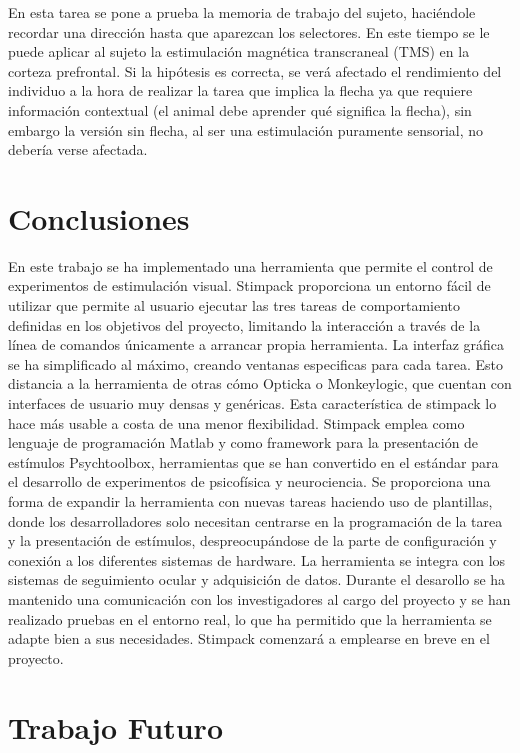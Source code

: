 \documentclass[conference]{IEEEtran}
\begin{document}
En esta tarea se pone a prueba la memoria de trabajo del sujeto, haciéndole recordar una dirección hasta que aparezcan los selectores. En este tiempo se le puede aplicar al sujeto la estimulación magnética transcraneal (TMS) en la corteza prefrontal. Si la hipótesis es correcta, se verá afectado el rendimiento del individuo a la hora de realizar la tarea que implica la flecha ya que requiere información contextual (el animal debe aprender qué significa la flecha), sin embargo la versión sin flecha, al ser una estimulación puramente sensorial, no debería verse afectada.

\section{Conclusiones}

En este trabajo se ha implementado una herramienta que permite el control de experimentos de estimulación visual.
Stimpack proporciona un entorno fácil de utilizar que permite al usuario ejecutar las tres tareas de comportamiento definidas en los objetivos del proyecto, limitando la interacción a través de la línea de comandos únicamente a arrancar propia herramienta. La interfaz gráfica se ha simplificado al máximo, creando ventanas especificas para cada tarea. Esto distancia a la herramienta de otras cómo Opticka o Monkeylogic, que cuentan con interfaces de usuario muy densas y genéricas. Esta característica de stimpack lo hace más usable a costa de una menor flexibilidad.
Stimpack emplea como lenguaje de programación Matlab y como framework para la presentación de estímulos Psychtoolbox, herramientas que se han convertido en el estándar para el desarrollo de experimentos de psicofísica y neurociencia.
Se proporciona una forma de expandir la herramienta con nuevas tareas haciendo uso de plantillas, donde los desarrolladores solo necesitan centrarse en la programación de la tarea y la presentación de estímulos, despreocupándose de la parte de configuración y conexión a los diferentes sistemas de hardware.
La herramienta se integra con los sistemas de seguimiento ocular y adquisición de datos.
Durante el desarollo se ha mantenido una comunicación con los investigadores al cargo del proyecto y se han realizado pruebas en el entorno real, lo que ha permitido que la herramienta se adapte bien a sus necesidades. Stimpack comenzará a emplearse en breve en el proyecto.


\section{Trabajo Futuro}
\end{document}
